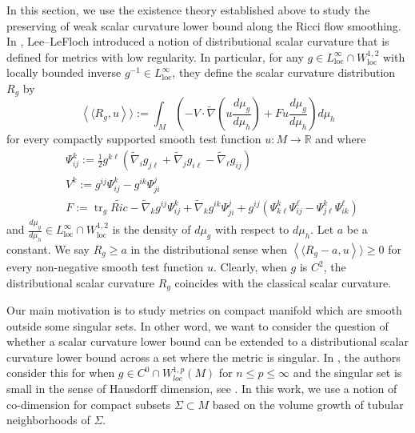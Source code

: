 \documentclass[12pt]{amsart}
\def\tr{\operatorname{tr}}
\theoremstyle{plain}
\theoremstyle{plain}
\theoremstyle{definition}
\theoremstyle{remark}
\numberwithin{equation}{subsection}
\newcommand{\hdel}{\tilde{\nabla}}
\begin{document}
In this section, we use the existence theory established above to study the preserving of weak scalar curvature lower bound along the Ricci flow smoothing.
In \cite{lee_positive_2015}, Lee--LeFloch introduced a notion of distributional scalar curvature that is defined for metrics with low regularity. In particular, for any $g \in L^\infty_{\text{loc}}\cap W^{1,2}_{\text{loc}}$ with locally bounded inverse $g^{-1}\in L^\infty_{\text{loc}}$, they define the scalar curvature distribution $R_g$ by
\begin{equation}\label{eqn:distributional-scalar-defn}
    \left\langle\langle R_g, u\right\rangle\rangle := \int_M \left(-V\cdot\hdel\left(u\frac{d\mu_g}{d\mu_h}\right)+Fu\frac{d\mu_g}{d\mu_h}\right)d\mu_h
\end{equation}
for every compactly supported smooth test function $u:M\to\mathbb{R}$ and where
\begin{align*}
    &\Psi^k_{ij} := \frac{1}{2}g^{k\ell}\left(\hdel_ig_{j\ell}+\hdel_jg_{i\ell}-\hdel_{\ell}g_{ij}\right) \\
    &V^k := g^{ij}\Psi^{k}_{ij} - g^{ik}\Psi^{j}_{ji} \\
    &F := \tr_g\widetilde{Ric} - \hdel_kg^{ij}\Psi^k_{ij} + \hdel_kg^{ik}\Psi^{j}_{ji} + g^{ij}\left(\Psi^{k}_{k\ell}\Psi^{\ell}_{ij} - \Psi^{k}_{j\ell}\Psi^{\ell}_{ik}\right)
\end{align*}
and $\frac{d\mu_g}{d\mu_h}\in L^\infty_{\text{loc}}\cap W^{1,2}_{\text{loc}}$ is the density of $d\mu_g$ with respect to $d\mu_h$. Let $a$ be a constant. We say $R_g \geq a$ in the distributional sense when $    \left\langle\langle R_g-a, u\right\rangle\rangle\geq 0$ for every non-negative smooth test function $u$. Clearly, when $g$ is $C^2$, the distributional scalar curvature $R_g$ coincides with the classical scalar curvature.


Our main motivation is to study metrics on compact manifold which are smooth outside some singular sets. In other word, we want to consider the question of whether a scalar curvature lower bound can be extended to a distributional scalar curvature lower bound across a set where the metric is singular.  In \cite{jiang_removable_2022}, the authors consider this for when $g \in C^0 \cap W^{1,p}_{loc}(M)$ for $n \leq p \leq \infty$ and the singular set is small in the sense of Hausdorff dimension, see  \cite[Lemma 2.7]{jiang_removable_2022}. In this work, we use a notion of co-dimension for compact subsets $\Sigma \subset M$ based on the volume growth of tubular neighborhoods of $\Sigma$. %
\end{document}

